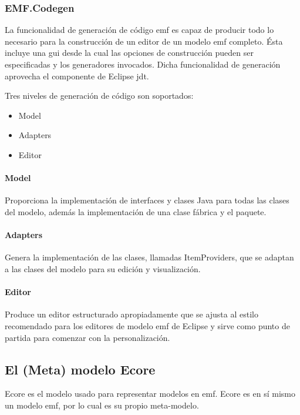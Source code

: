 \documentclass[a4paper,12pt,twoside,spanish,openright]{book}
\begin{document}
\subsubsection{EMF.Codegen}

La funcionalidad de generación de código \gls{emf} es capaz de producir todo lo necesario para la construcción de un editor de un modelo \gls{emf} completo. Ésta incluye una \gls{gui} desde la cual las opciones de construcción pueden ser especificadas y los generadores invocados. Dicha funcionalidad de generación aprovecha el componente de \textsf{Eclipse} \gls{jdt}.

Tres niveles de generación de código son soportados: 
\begin{itemize}
\item Model
\item Adapters 
\item Editor
\end{itemize}

\paragraph{Model}

Proporciona la implementación de interfaces y clases \textsf{Java} para todas las clases del modelo, además la implementación de una clase fábrica y el paquete.

\paragraph{Adapters}

Genera la implementación de las clases, llamadas \textsf{ItemProviders}, que se adaptan a las clases del modelo para su edición y visualización.

\paragraph{Editor}

Produce un editor estructurado apropiadamente que se ajusta al estilo recomendado para los editores de modelo \gls{emf} de \textsf{Eclipse} y sirve como punto de partida para comenzar con la personalización.


\subsection{El (Meta) modelo Ecore}

\textsf{Ecore} es el modelo usado para representar modelos en \gls{emf}. \textsf{Ecore} es en sí mismo un modelo \gls{emf}, por lo cual es su propio meta-modelo. 
\end{document}
